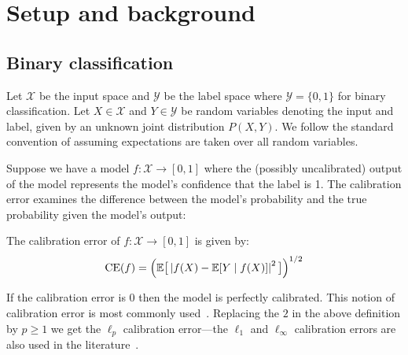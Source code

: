 \section{Setup and background}
\label{sec:formulation}

\newcommand{\ce}[0]{\ensuremath{\textup{CE}}}
\newcommand{\lpce}[0]{\ensuremath{\ell_p\textup{-CE}}}
\newcommand{\ltwoce}[0]{\ensuremath{\ell_2\textup{-CE}}}
\newcommand{\lsquared}[0]{\ensuremath{L^2}}
\newcommand{\squaredce}[0]{\ensuremath{L^2\textup{-CE}}}
\newcommand{\topce}[0]{\ensuremath{\textup{TCE}}}
\newcommand{\margsquaredce}[0]{\ensuremath{\textup{MCE}}}
\newcommand{\mse}[0]{\ensuremath{\textup{MSE}}}

\subsection{Binary classification}

Let $\mathcal{X}$ be the input space and $\mathcal{Y}$ be the label space where $\mathcal{Y} = \{0, 1\}$ for binary classification.
Let $X \in \mathcal{X}$ and $Y \in \mathcal{Y}$ be random variables denoting the input and label, given by an unknown joint distribution  $P(X, Y)$. We follow the standard convention of assuming expectations are taken over all random variables.

Suppose we have a model $f : \mathcal{X} \to [0, 1]$ where the (possibly uncalibrated) output of the model represents the model's confidence that the label is 1. The calibration error examines the difference between the model's probability and the true probability given the model's output:

\begin{definition}
The calibration error of $f : \mathcal{X} \to [0, 1]$ is given by:
\begin{align}
\ce(f) = \Big(\expect\big[ \left|f(X) - \expect[Y \mid f(X)] \right|^2 \big] \Big)^{1/2}
\end{align}
\end{definition}

If the calibration error is $0$ then the model is perfectly calibrated. This notion of calibration error is most commonly used~\cite{murphy1973vector,murphy1977reliability,degroot1983forecasters, nguyen2015posterior, hendrycks2019anomaly, kuleshov2015calibrated, hendrycks2019pretraining, brocker2012empirical}. Replacing the $2$ in the above definition by $p \geq 1$ we get the $\ell_p$ calibration error---the $\ell_1$ and $\ell_{\infty}$ calibration errors are also used in the literature~\cite{guo2017calibration, naeini2015obtaining, nixon2019calibration}. 

